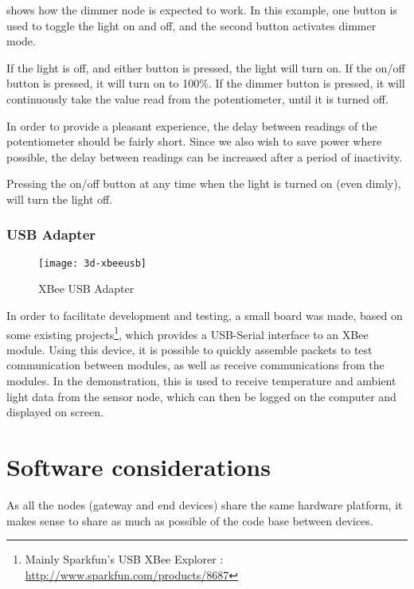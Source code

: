  shows how the dimmer node is expected to work. In
this example, one button is used to toggle the light on and off, and the second
button activates dimmer mode. 

If the light is off, and either button is pressed, the light will turn on. If
the on/off button is pressed, it will turn on to 100\%. If the dimmer button is
pressed, it will continuously take the value read from the potentiometer, until
it is turned off.

In order to provide a pleasant experience, the delay between readings of the
potentiometer should be fairly short. Since we also wish to save power where
possible, the delay between readings can be increased after a period of
inactivity.

Pressing the on/off button at any time when the light is turned on (even dimly),
will turn the light off.


\subsubsection{USB Adapter}
\label{sub2:xbee-usb}

\begin{figure}[h]
  \begin{center}
    \texttt{[image: 3d-xbeeusb]}
  \end{center}
  \caption{XBee USB Adapter}
  \label{fig:xbeeusb}
\end{figure}

In order to facilitate development and testing, a small board was made,
based on some existing projects\footnote{Mainly Sparkfun's USB XBee Explorer :
\url{http://www.sparkfun.com/products/8687}}, which provides a USB-Serial
interface to an XBee module. Using this device, it is possible to quickly
assemble packets to test communication between modules, as well as receive
communications from the modules. In the demonstration, this is used to receive
temperature and ambient light data from the sensor node, which can then be
logged on the computer and displayed on screen.

\pagebreak
\section{Software considerations}

As all the nodes (gateway and end devices) share the same hardware platform, it
makes sense to share as much as possible of the code base between devices.

